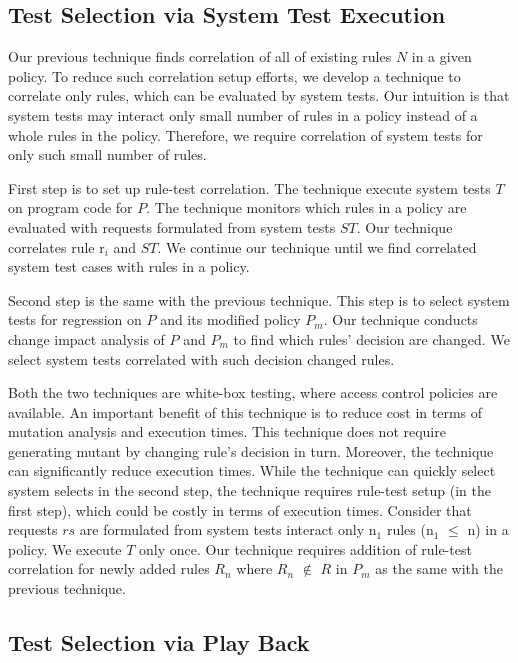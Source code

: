 \subsection{Test Selection via System Test Execution}

Our previous technique finds correlation of all of existing rules $N$ in a given policy. To reduce
such correlation setup efforts, we develop a technique to correlate only rules, which can be evaluated
by system tests. Our intuition is that system tests may interact only small number of rules in a policy
instead of a whole rules in the policy. Therefore, we require correlation of system tests for only such small number of rules.

First step is to set up rule-test correlation.
The technique execute system tests $T$ on program code for $P$. The technique monitors which rules in a policy are evaluated with
requests formulated from system tests $ST$. Our technique correlates rule r$_i$ and $ST$.
We continue our technique until we find correlated system test cases with rules in a policy.

Second step is the same with the previous technique. This step is to select system tests for regression on $P$ and its modified policy $P_m$.
Our technique conducts change impact analysis of $P$ and $P_m$ to find which rules' decision are changed.
We select system tests correlated with such decision changed rules.

Both the two techniques are white-box testing, where access control policies are available.
An important benefit of this technique is to reduce cost in terms of mutation analysis and execution times. This technique does not require generating mutant by changing rule's decision in turn. Moreover, the technique can significantly reduce execution times.
While the technique can quickly select system selects in the second step, the technique requires rule-test setup (in the first step), which could be costly in terms of execution times. Consider that requests $rs$ are formulated from system tests interact only n$_1$ rules (n$_1$ $\leq$ n) in a policy.
We execute $T$ only once. Our technique requires addition of rule-test
correlation for newly added rules $R_n$ where $R_n$ $\notin$ $R$ in $P_m$ as the same with the previous technique.


\subsection{Test Selection via Play Back}

